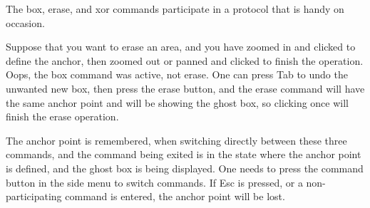 The {\cb box}, {\cb erase}, and {\cb xor} commands participate in a
protocol that is handy on occasion.

Suppose that you want to erase an area, and you have zoomed in and
clicked to define the anchor, then zoomed out or panned and clicked to
finish the operation.  Oops, the {\cb box} command was active, not
{\cb erase}.  One can press {\kb Tab} to undo the unwanted new box,
then press the {\cb erase} button, and the {\cb erase} command will
have the same anchor point and will be showing the ghost box, so
clicking once will finish the erase operation.

The anchor point is remembered, when switching directly between these
three commands, and the command being exited is in the state where the
anchor point is defined, and the ghost box is being displayed.  One
needs to press the command button in the side menu to switch commands. 
If {\kb Esc} is pressed, or a non-participating command is entered,
the anchor point will be lost.

